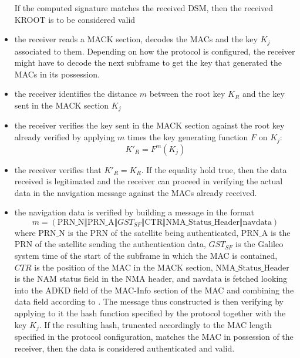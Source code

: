 \begin{itemize}
If the computed signature matches the received DSM, then the received KROOT is
to be considered valid
\item the receiver reads a MACK section, decodes the MACs and the key $K_j$
associated to them. Depending on how the protocol is configured, the receiver
might have to decode the next subframe to get the key that generated the MACs in
its possession.
\item the receiver identifies the distance $m$ between the root key $K_R$ and
the key sent in the MACK section $K_j$
\item the receiver verifies the key sent in the MACK section against the root
key already verified by applying $m$ times the key generating function $F$ on
$K_j$:
\[
K'_R = F^m(K_j)
\]
\item the receiver verifies that $K'_R = K_R$. If the equality hold true, then
the data received is legitimated and the receiver can proceed in verifying the
actual data in the navigation message against the MACs already received.
\item the navigation data is verified by building a message in the format
\[
m = (\text{PRN\_N} \Vert \text{PRN\_A} \Vert GST_{SF} \Vert \text{CTR} \Vert
\text{NMA\_Status\_Header} \Vert \text{navdata})
\]
where $\text{PRN\_N}$ is the PRN of the satellite being authenticated,
$\text{PRN\_A}$ is the PRN of the satellite sending the authentication data,
$GST_{SF}$ is the Galileo system time of the start of the subframe in which the
MAC is contained, $CTR$ is the position of the MAC in the MACK section,
$\text{NMA\_Status\_Header}$ is the NAM status field in the NMA header, and
$\text{navdata}$ is fetched looking into the ADKD field of the MAC-Info section
of the MAC and combining the data field according to \cite{osnma}. The message
thus constructed is then verifying by applying to it the hash function specified
by the protocol together with the key $K_j$. If the resulting hash, truncated
accordingly to the MAC length specified in the protocol configuration, matches
the MAC in possession of the receiver, then the data is considered authenticated
and valid.
\end{itemize}
